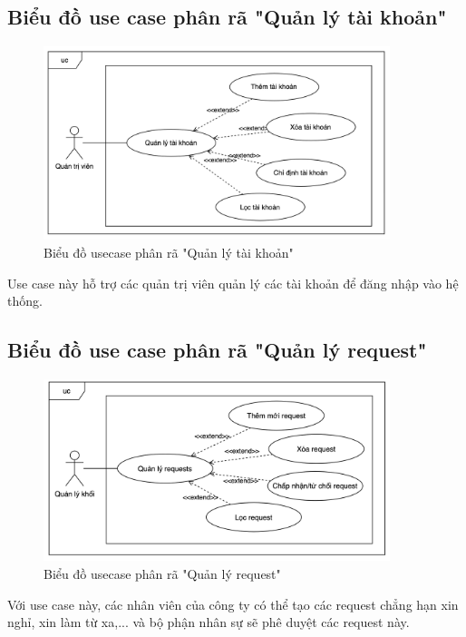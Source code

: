 \documentclass[../DoAn.tex]{subfiles}
\begin{document}
\subsection{Biểu đồ use case phân rã "Quản lý tài khoản"}
\label{subsection:2.2.7}
\begin{figure}[H]
    \centering
    \includegraphics[width=0.9\textwidth]{Hinhve/UC_QuanLyTaiKhoan.png}
    \caption{Biểu đồ usecase phân rã "Quản lý tài khoản"}
\end{figure}
Use case này hỗ trợ các quản trị viên quản lý các tài khoản để đăng nhập vào hệ thống.

\subsection{Biểu đồ use case phân rã "Quản lý request"}
\label{subsection:2.2.8}
\begin{figure}[H]
    \centering
    \includegraphics[width=0.9\textwidth]{Hinhve/UC_QuanLyRequest.png}
    \caption{Biểu đồ usecase phân rã "Quản lý request"}
\end{figure}
Với use case này, các nhân viên của công ty có thể tạo các request chẳng hạn xin nghỉ, xin làm từ xa,... và bộ phận nhân sự sẽ phê duyệt các request này.
\end{document}
